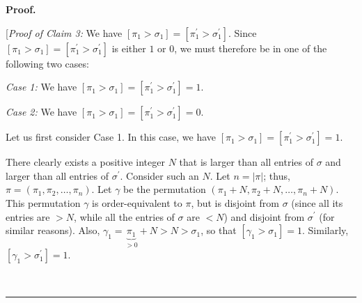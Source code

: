 \documentclass[numbers=enddot,12pt,final,onecolumn,notitlepage]{scrartcl}%
\theoremstyle{definition}
\newenvironment{statement}{\begin{quote}}{\end{quote}}
\newenvironment{proof}[1][Proof]{\noindent\textbf{#1.} }{\ \rule{0.5em}{0.5em}}
\begin{document}
\begin{proof}
\begin{statement}
\end{statement}

[\textit{Proof of Claim 3:} We have $\left[  \pi_{1}>\sigma_{1}\right]
=\left[  \pi_{1}^{\prime}>\sigma_{1}^{\prime}\right]  $. Since $\left[
\pi_{1}>\sigma_{1}\right]  =\left[  \pi_{1}^{\prime}>\sigma_{1}^{\prime
}\right]  $ is either $1$ or $0$, we must therefore be in one of the following
two cases:

\textit{Case 1:} We have $\left[  \pi_{1}>\sigma_{1}\right]  =\left[  \pi
_{1}^{\prime}>\sigma_{1}^{\prime}\right]  =1$.

\textit{Case 2:} We have $\left[  \pi_{1}>\sigma_{1}\right]  =\left[  \pi
_{1}^{\prime}>\sigma_{1}^{\prime}\right]  =0$.

Let us first consider Case 1. In this case, we have $\left[  \pi_{1}%
>\sigma_{1}\right]  =\left[  \pi_{1}^{\prime}>\sigma_{1}^{\prime}\right]  =1$.

There clearly exists a positive integer $N$ that is larger than all entries of
$\sigma$ and larger than all entries of $\sigma^{\prime}$. Consider such an
$N$. Let $n=\left\vert \pi\right\vert $; thus, $\pi=\left(  \pi_{1},\pi
_{2},\ldots,\pi_{n}\right)  $. Let $\gamma$ be the permutation $\left(
\pi_{1}+N,\pi_{2}+N,\ldots,\pi_{n}+N\right)  $. This permutation $\gamma$ is
order-equivalent to $\pi$, but is disjoint from $\sigma$ (since all its
entries are $>N$, while all the entries of $\sigma$ are $<N$) and disjoint
from $\sigma^{\prime}$ (for similar reasons). Also, $\gamma_{1}%
=\underbrace{\pi_{1}}_{>0}+N>N>\sigma_{1}$, so that $\left[  \gamma_{1}%
>\sigma_{1}\right]  =1$. Similarly, $\left[  \gamma_{1}>\sigma_{1}^{\prime
}\right]  =1$.


\end{proof}
\end{document}
